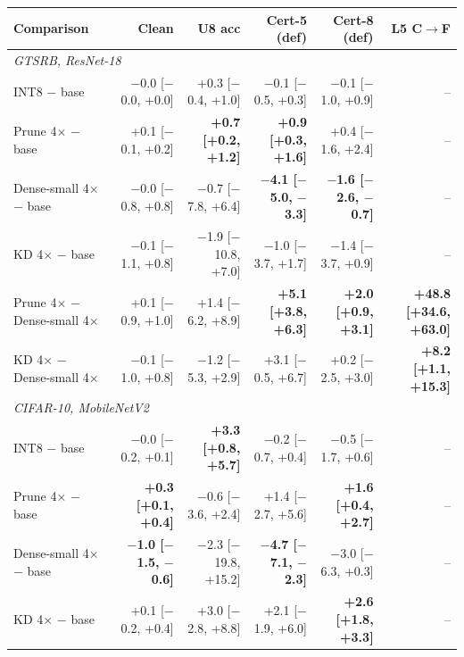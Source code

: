 \begin{tabular}{lrrrrr}
\toprule
Comparison & Clean & U8 acc & Cert-5 (def) & Cert-8 (def) & L5 C$\to$F \\
\midrule
\multicolumn{6}{l}{\textit{GTSRB, ResNet-18}} \\
INT8 $-$ base & $-$0.0 {\scriptsize[$-$0.0, +0.0]} & +0.3 {\scriptsize[$-$0.4, +1.0]} & $-$0.1 {\scriptsize[$-$0.5, +0.3]} & $-$0.1 {\scriptsize[$-$1.0, +0.9]} & -- \\
Prune 4$\times$ $-$ base & +0.1 {\scriptsize[$-$0.1, +0.2]} & \textbf{+0.7 {\scriptsize[+0.2, +1.2]}} & \textbf{+0.9 {\scriptsize[+0.3, +1.6]}} & +0.4 {\scriptsize[$-$1.6, +2.4]} & -- \\
Dense-small 4$\times$ $-$ base & $-$0.0 {\scriptsize[$-$0.8, +0.8]} & $-$0.7 {\scriptsize[$-$7.8, +6.4]} & \textbf{$-$4.1 {\scriptsize[$-$5.0, $-$3.3]}} & \textbf{$-$1.6 {\scriptsize[$-$2.6, $-$0.7]}} & -- \\
KD 4$\times$ $-$ base & $-$0.1 {\scriptsize[$-$1.1, +0.8]} & $-$1.9 {\scriptsize[$-$10.8, +7.0]} & $-$1.0 {\scriptsize[$-$3.7, +1.7]} & $-$1.4 {\scriptsize[$-$3.7, +0.9]} & -- \\
Prune 4$\times$ $-$ Dense-small 4$\times$ & +0.1 {\scriptsize[$-$0.9, +1.0]} & +1.4 {\scriptsize[$-$6.2, +8.9]} & \textbf{+5.1 {\scriptsize[+3.8, +6.3]}} & \textbf{+2.0 {\scriptsize[+0.9, +3.1]}} & \textbf{+48.8 {\scriptsize[+34.6, +63.0]}} \\
KD 4$\times$ $-$ Dense-small 4$\times$ & $-$0.1 {\scriptsize[$-$1.0, +0.8]} & $-$1.2 {\scriptsize[$-$5.3, +2.9]} & +3.1 {\scriptsize[$-$0.5, +6.7]} & +0.2 {\scriptsize[$-$2.5, +3.0]} & \textbf{+8.2 {\scriptsize[+1.1, +15.3]}} \\
\midrule
\multicolumn{6}{l}{\textit{CIFAR-10, MobileNetV2}} \\
INT8 $-$ base & $-$0.0 {\scriptsize[$-$0.2, +0.1]} & \textbf{+3.3 {\scriptsize[+0.8, +5.7]}} & $-$0.2 {\scriptsize[$-$0.7, +0.4]} & $-$0.5 {\scriptsize[$-$1.7, +0.6]} & -- \\
Prune 4$\times$ $-$ base & \textbf{+0.3 {\scriptsize[+0.1, +0.4]}} & $-$0.6 {\scriptsize[$-$3.6, +2.4]} & +1.4 {\scriptsize[$-$2.7, +5.6]} & \textbf{+1.6 {\scriptsize[+0.4, +2.7]}} & -- \\
Dense-small 4$\times$ $-$ base & \textbf{$-$1.0 {\scriptsize[$-$1.5, $-$0.6]}} & $-$2.3 {\scriptsize[$-$19.8, +15.2]} & \textbf{$-$4.7 {\scriptsize[$-$7.1, $-$2.3]}} & $-$3.0 {\scriptsize[$-$6.3, +0.3]} & -- \\
KD 4$\times$ $-$ base & +0.1 {\scriptsize[$-$0.2, +0.4]} & +3.0 {\scriptsize[$-$2.8, +8.8]} & +2.1 {\scriptsize[$-$1.9, +6.0]} & \textbf{+2.6 {\scriptsize[+1.8, +3.3]}} & -- \\

\end{tabular}
